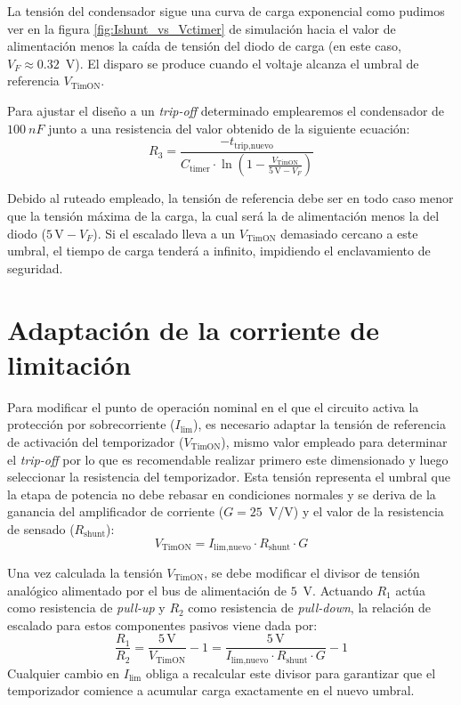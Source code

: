 \documentclass[12pt]{report} %
\begin{document}
La tensión del condensador sigue una curva de carga exponencial como pudimos ver en la figura \ref{fig:Ishunt_vs_Vctimer} de simulación hacia el valor de alimentación menos la caída de tensión del diodo de carga (en este caso, $V_F \approx 0.32$~V). El disparo se produce cuando el voltaje alcanza el umbral de referencia $V_\text{TimON}$.

Para ajustar el diseño a un \textit{trip-off} determinado emplearemos el condensador de $100~nF$ junto a una resistencia del valor obtenido de la siguiente ecuación:
\begin{equation}
    R_3 = \frac{-t_\text{trip,nuevo}}{C_\text{timer} \cdot \ln\left(1 - \frac{V_\text{TimON}}{5\,\text{V} - V_F}\right)}
\end{equation}

Debido al ruteado empleado, la tensión de referencia debe ser en todo caso menor que la tensión máxima de la carga, la cual será la de alimentación menos la del diodo ($5\,\text{V} - V_F$). Si el escalado lleva a un $V_\text{TimON}$ demasiado cercano a este umbral, el tiempo de carga tenderá a infinito, impidiendo el enclavamiento de seguridad.

\section{Adaptación de la corriente de limitación}

Para modificar el punto de operación nominal en el que el circuito activa la protección por sobrecorriente ($I_\text{lim}$), es necesario adaptar la tensión de referencia de activación del temporizador ($V_\text{TimON}$), mismo valor empleado para determinar el \textit{trip-off} por lo que es recomendable realizar primero este dimensionado y luego seleccionar la resistencia del temporizador. Esta tensión representa el umbral que la etapa de potencia no debe rebasar en condiciones normales y se deriva de la ganancia del amplificador de corriente ($G = 25$~V/V) y el valor de la resistencia de sensado ($R_\text{shunt}$):
\begin{equation}
    V_\text{TimON} = I_\text{lim,nuevo} \cdot R_\text{shunt} \cdot G
\end{equation}

Una vez calculada la tensión $V_\text{TimON}$, se debe modificar el divisor de tensión analógico alimentado por el bus de alimentación de $5$~V. Actuando $R_1$ actúa como resistencia de \textit{pull-up} y $R_2$ como resistencia de \textit{pull-down}, la relación de escalado para estos componentes pasivos viene dada por:
\begin{equation}
    \frac{R_1}{R_2} = \frac{5\,\text{V}}{V_\text{TimON}} - 1 = \frac{5\,\text{V}}{I_\text{lim,nuevo} \cdot R_\text{shunt} \cdot G} - 1
\end{equation}
Cualquier cambio en $I_\text{lim}$ obliga a recalcular este divisor para garantizar que el temporizador comience a acumular carga exactamente en el nuevo umbral.
\end{document}
